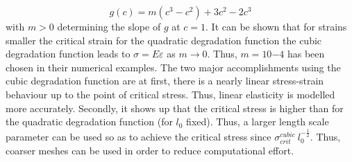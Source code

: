 \begin{equation} \label{eq:cubic_degr_fct}
	g\left(c\right)=m\left(c^{3}-c^{2}\right)+3c^{2}-2c^{3}
\end{equation}
with $m>0$ determining the slope of $g$ at $c=1$. It can be shown that for strains smaller the critical strain for the quadratic degradation function the cubic degradation function leads to $\sigma=E\varepsilon$ as $m\rightarrow0$. Thus, $m=10{-4}$ has been chosen in their numerical examples. The two major accomplishments using the cubic degradation function are at first, there is a nearly linear stress-strain behaviour up to the point of critical stress. Thus, linear elasticity is modelled more accurately. Secondly, it shows up that the critical stress is higher than for the quadratic degradation function (for $l_{0}$ fixed). Thus, a larger length scale parameter can be used so as to achieve the critical stress since $\sigma_{crit}^{cubic}~l_{0}^{-\frac{1}{2}}$. Thus, coarser meshes can be used in order to reduce computational effort.